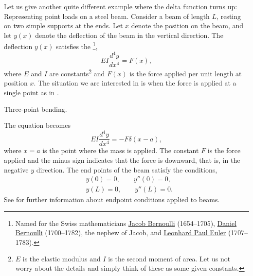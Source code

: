 Let us give another quite different
example where the delta function turns up:
Representing point loads on a steel beam.  Consider a beam
of length $L$, resting on two simple supports at the ends.  Let $x$ denote
the position on the beam, and let $y(x)$ denote the deflection of the beam in
the vertical direction.  The deflection $y(x)$ satisfies the
\emph{}%
\footnote{Named for the Swiss mathematicians
\href{https://en.wikipedia.org/wiki/Jacob_Bernoulli}{Jacob Bernoulli}
(1654--1705),
\href{https://en.wikipedia.org/wiki/Daniel_Bernoulli}{Daniel Bernoulli}
(1700--1782), the nephew of Jacob,
and
\href{https://en.wikipedia.org/wiki/Euler}{Leonhard Paul Euler}
(1707--1783).},
\begin{equation*}
EI \frac{d^4 y}{dx^4} = F(x) ,
\end{equation*}
where $E$ and $I$ are constants\footnote{$E$ is the elastic modulus and $I$
is the second moment of area.  Let us not worry about the details and simply
think of these as some given constants.} and
$F(x)$ is the force applied per unit length at position $x$.  The situation
we are interested in is when the force is applied at a single point as in
.

\begin{myfig}
\capstart
{}
\caption{Three-point bending.\label{lt:beambendingfig}}
\end{myfig}

The equation becomes
\begin{equation*}
EI \frac{d^4 y}{dx^4} = -F \delta(x-a) ,
\end{equation*}
where $x=a$ is the point where the mass is applied.  The constant $F$ is the force
applied and the minus sign indicates that the force is downward, that is, in the
negative $y$ direction.  The end points of the
beam satisfy the conditions,
\begin{align*}
& y(0) = 0, \qquad y''(0) = 0, \\
& y(L) = 0, \qquad y''(L) = 0.
\end{align*}
See  for further information about endpoint
conditions applied to beams.


